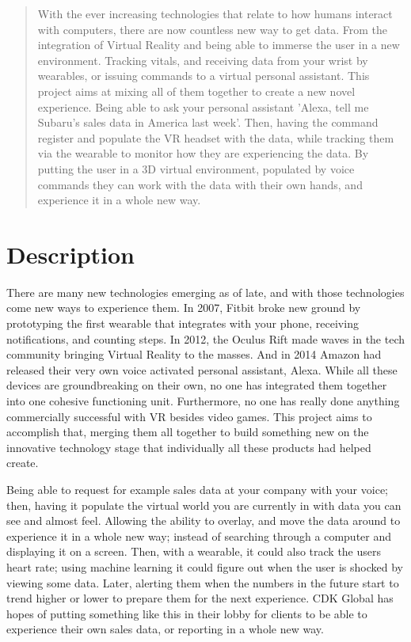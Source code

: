 \documentclass[onecolumn, draftclsnofoot,10pt, compsoc]{IEEEtran}
\begin{document}
\begin{titlepage}
\begin{singlespace}
\begin{abstract}
        With the ever increasing technologies that relate to how humans interact with computers, there are now countless new way to get data. From the integration of Virtual Reality and being able to immerse the user in a new environment. Tracking  vitals,  and receiving data from your wrist by wearables, or issuing commands to a virtual personal assistant. This project aims at mixing all of them together to create a new novel experience. Being able to ask your personal assistant 'Alexa, tell me Subaru’s sales data in America last week'. Then, having the command register and populate the VR headset with the data, while tracking them via the wearable to monitor how they are experiencing the data. By putting the user in a 3D virtual environment, populated by voice commands they can work with the data with their own hands, and experience it in a whole new way. 


        \end{abstract}
    \end{singlespace}
\end{titlepage}
\newpage
{}
\tableofcontents
\clearpage

\section{Description}
There are many new technologies emerging as of late, and with those technologies come new ways to experience them. In 2007, Fitbit broke new ground by prototyping the first wearable that integrates with your phone, receiving notifications, and counting steps. In 2012, the Oculus Rift made waves in the tech community bringing Virtual Reality to the masses. And in 2014 Amazon had released their very own voice activated personal assistant, Alexa. While all these devices are groundbreaking on their own, no one has integrated them together into one cohesive functioning unit. Furthermore, no one has really done anything commercially successful with VR besides video games. This project aims to accomplish that, merging them all together to build something new on the innovative technology stage that individually all these products had helped create. 

Being able to request for example sales data at your company with your voice; then, having it populate the virtual world you are currently in with data you can see and almost feel. Allowing the ability to overlay, and move the data around to experience it in a whole new way; instead of searching through a computer and displaying it on a screen. Then, with a wearable, it could also track the users heart rate; using machine learning it could figure out when the user is shocked by viewing some data. Later, alerting them when the numbers in the future start to trend higher or lower to prepare them for the next experience. CDK Global has hopes of putting something like this in their lobby for clients to be able to experience their own sales data, or reporting in a whole new way. 
\end{document}
